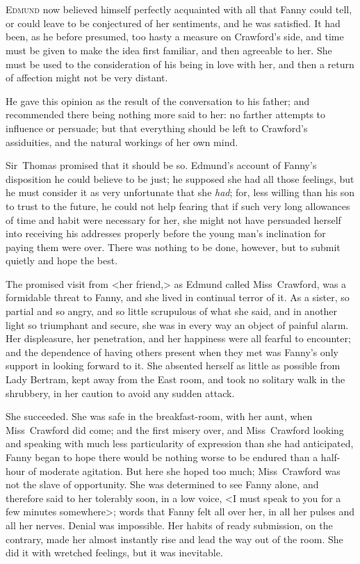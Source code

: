 \chapter[Chapter \thechapter]{} 

 \lettrine[lraise=0.3]{E}{dmund} now believed himself perfectly acquainted with all that Fanny could tell, or could leave to be conjectured of her sentiments, and he was satisfied. It had been, as he before presumed, too hasty a measure on Crawford's side, and time must be given to make the idea first familiar, and then agreeable to her. She must be used to the consideration of his being in love with her, and then a return of affection might not be very distant.

He gave this opinion as the result of the conversation to his father; and recommended there being nothing more said to her: no farther attempts to influence or persuade; but that everything should be left to Crawford's assiduities, and the natural workings of her own mind.

Sir~Thomas promised that it should be so. Edmund's account of Fanny's disposition he could believe to be just; he supposed she had all those feelings, but he must consider it as very unfortunate that she \textit{had}; for, less willing than his son to trust to the future, he could not help fearing that if such very long allowances of time and habit were necessary for her, she might not have persuaded herself into receiving his addresses properly before the young man's inclination for paying them were over. There was nothing to be done, however, but to submit quietly and hope the best.

The promised visit from <her friend,> as Edmund called Miss~Crawford, was a formidable threat to Fanny, and she lived in continual terror of it. As a sister, so partial and so angry, and so little scrupulous of what she said, and in another light so triumphant and secure, she was in every way an object of painful alarm. Her displeasure, her penetration, and her happiness were all fearful to encounter; and the dependence of having others present when they met was Fanny's only support in looking forward to it. She absented herself as little as possible from Lady Bertram, kept away from the East room, and took no solitary walk in the shrubbery, in her caution to avoid any sudden attack.

She succeeded. She was safe in the breakfast-room, with her aunt, when Miss~Crawford did come; and the first misery over, and Miss~Crawford looking and speaking with much less particularity of expression than she had anticipated, Fanny began to hope there would be nothing worse to be endured than a half-hour of moderate agitation. But here she hoped too much; Miss~Crawford was not the slave of opportunity. She was determined to see Fanny alone, and therefore said to her tolerably soon, in a low voice, <I must speak to you for a few minutes somewhere>; words that Fanny felt all over her, in all her pulses and all her nerves. Denial was impossible. Her habits of ready submission, on the contrary, made her almost instantly rise and lead the way out of the room. She did it with wretched feelings, but it was inevitable.

